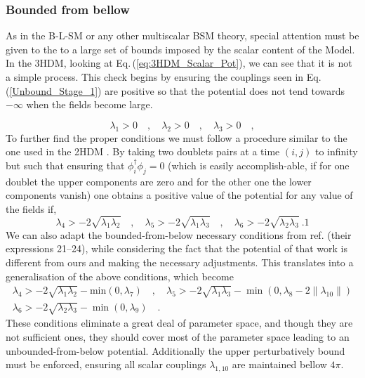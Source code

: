 \subsubsection{Bounded from bellow}

As in the B-L-SM or any other multiscalar BSM theory, special attention must be given to the to a large set of bounds imposed by the scalar content of the Model. 
%
In the 3HDM, looking at Eq.\,(\ref{eq:3HDM_Scalar_Pot}), we can see that it is not a simple process. This check begins by ensuring the couplings seen in Eq.\,(\ref{Unbound_Stage_1}) are positive so that the potential does not tend towards $-\infty$ when the fields become large. 

\begin{equation}
\label{Unbound_Stage_1}
\lambda_1 > 0  \quad , \quad \lambda_2 > 0 \quad , \quad \lambda_3 > 0 \quad , 
\end{equation}
%
To further find the proper conditions we must follow a procedure similar to the one used in the 2HDM \cite{Branco_1996}.
%
By taking two doublets pairs at a time $(i, j)$ to infinity but such that ensuring that $\phi_i^\dagger \phi_j = 0$ (which is easily accomplish-able, if for one doublet the upper components are zero and for the other one the lower components vanish) one obtains a positive value of the potential for any value of the fields if,
%
\begin{equation}
\lambda_4 > -2 \sqrt{\lambda_1 \lambda_2} \quad , \quad \lambda_5 > -2 \sqrt{\lambda_1 \lambda_3} \quad , \quad \lambda_6 > -2 \sqrt{\lambda_2 \lambda_3} \ . 1
\end{equation}
%
We can also adapt the bounded-from-below necessary conditions from ref. \cite{Moretti_2015} (their expressions 21–24), while considering the fact that the potential of that work is different from ours and making the necessary adjustments.
%
This translates into a generalisation of the above conditions, which become
%
\begin{equation}
\begin{gathered}
\lambda_4 > - 2 \sqrt{\lambda_1 \lambda_2} - \text{min}(0,\lambda_7) \quad , \quad  \lambda_5 > -2 \sqrt{\lambda_1 \lambda_3} - \min(0,\lambda_8 - 2\|\lambda_{10}\|)  \\
\lambda_6 > - 2 \sqrt{\lambda_2 \lambda_3} - \min(0,\lambda_9) \quad . 
\end{gathered} 
\end{equation}
%
These conditions eliminate a great deal of parameter space, and though they are not sufficient ones, they should cover most of the parameter space leading to an unbounded-from-below potential.
% 
Additionally the upper perturbatively bound must be enforced, ensuring all scalar couplings $\lambda_{1,10}$ are maintained bellow $4\pi$.

